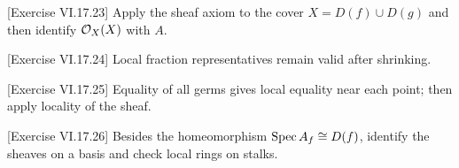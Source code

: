 \begin{hint}
[Exercise VI.17.23]
Apply the sheaf axiom to the cover $X=D(f)\cup D(g)$ and then identify $\mathcal O_X(X)$ with $A$.
\end{hint}

\begin{hint}
[Exercise VI.17.24]
Local fraction representatives remain valid after shrinking.
\end{hint}

\begin{hint}
[Exercise VI.17.25]
Equality of all germs gives local equality near each point; then apply locality of the sheaf.
\end{hint}

\begin{hint}
[Exercise VI.17.26]
Besides the homeomorphism $\operatorname{Spec} A_f\cong D(f)$, identify the sheaves on a basis and check local rings on stalks.
\end{hint}
